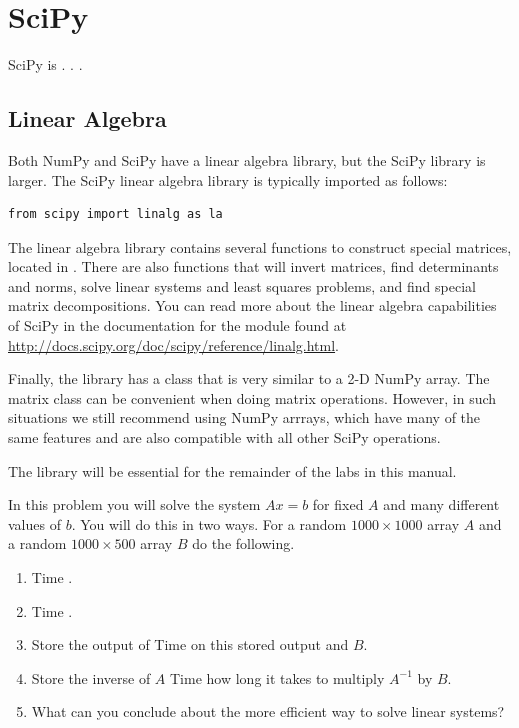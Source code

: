\section*{SciPy} %

SciPy is . . .

\subsection*{Linear Algebra} %

Both NumPy and SciPy have a linear algebra library, but the SciPy library is larger.
The SciPy linear algebra library is typically imported as follows:

\begin{lstlisting}
from scipy import linalg as la
\end{lstlisting}

The linear algebra library contains several functions to construct special
matrices, located in .
There are also functions that will invert matrices, find determinants and norms, solve linear systems and least squares problems, and find special matrix decompositions.
You can read more about the linear algebra capabilities of SciPy in the documentation for the  module found at \url{http://docs.scipy.org/doc/scipy/reference/linalg.html}.

Finally, the  library has a  class that is very
similar to a 2-D NumPy array.
The matrix class can be convenient when doing matrix operations.
However, in such situations we still recommend using NumPy arrrays, which have many of the same features and are also compatible with all other SciPy operations.

The  library will be essential for the remainder of the labs in this manual.


In this problem you will solve the system $Ax = b$ for fixed $A$ and many different values of $b$.
You will do this in two ways.
For a random $1000 \times 1000$ array $A$ and a random $1000 \times 500$ array $B$ do the following.
\begin{enumerate}
\item Time .
\item Time .
\item Store the output of 
Time  on this stored output and $B$.
\item Store the inverse of $A$
Time how long it takes to multiply $A^{-1}$ by $B$.
\item What can you conclude about the more efficient way to solve linear systems?
\end{enumerate}


